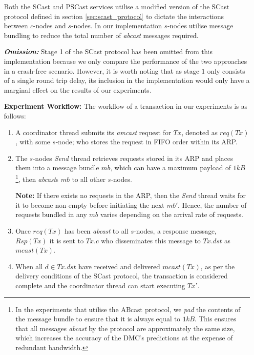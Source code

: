 	Both the \textsf{SCast} and \textsf{PSCast} services utilise a modified version of the \textsf{SCast} protocol defined in section \ref{sec:scast_protocol} to dictate the interactions between $c$-nodes and $s$-nodes.  In our implementation $s$-nodes utilise message bundling to reduce the total number of \emph{abcast} messages required.  
	
    \textbf{\emph{Omission:}} Stage 1 of the \textsf{SCast} protocol has been omitted from this implementation because we only compare the performance of the two approaches in a crash-free scenario.  However, it is worth noting that as stage 1 only consists of a single round trip delay, its inclusion in the implementation would only have a marginal effect on the results of our experiments.  	
	
	\textbf{Experiment Workflow:} The workflow of a transaction in our experiments is as follows:
    \begin{enumerate}
        \item    A coordinator thread submits its \emph{amcast} request for $Tx$, denoted as $req(Tx)$, with some $s$-node; who stores the request in FIFO order within its ARP. 
        
        \item    The $s$-nodes \emph{Send} thread retrieves requests stored in its ARP and places them into a message bundle $mb$, which can have a maximum payload of $1kB$ \footnote{In the experiments that utilise the \textsf{ABcast} protocol, we \emph{pad} the contents of the message bundle to ensure that it is always equal to $1kB$.  This ensures that all messages \emph{abcast} by the protocol are approximately the same size, which increases the accuracy of the DMC's predictions at the expense of redundant bandwidth.}, then \emph{abcast}s $mb$ to all other $s$-nodes.  
        
        \textbf{Note:} If there exists no requests in the ARP, then the \emph{Send} thread waits for it to become non-empty before initiating the next $mb'$.  Hence, the number of requests bundled in any $mb$ varies depending on the arrival rate of requests. 
        
        \item    Once $req(Tx)$ has been \emph{abcast} to all $s$-nodes, a response message, $Rsp(Tx)$ it is sent to $Tx.c$ who disseminates this message to $Tx.dst$ as $mcast(Tx)$.  
        
        \item    When all $d \in Tx.dst$ have received and delivered $mcast(Tx)$, as per the delivery conditions of the \textsf{SCast} protocol, the transaction is considered complete and the coordinator thread can start executing $Tx'$.  
    \end{enumerate}	
	
